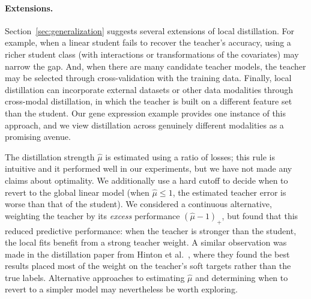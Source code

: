 \documentclass[12pt]{article}
\theoremstyle{definition}
\begin{document}
\paragraph{Extensions.} Section~\ref{sec:generalization} suggests several extensions of local distillation. For example, when a linear student fails to recover the teacher's accuracy, using a richer student class (with interactions or transformations of the covariates) may narrow the gap. And, when there are many candidate teacher models, the teacher may be selected through cross-validation with the training data. Finally, local distillation can incorporate external datasets or other data modalities through cross-modal distillation, in which the teacher is built on a different feature set than the student. Our gene expression example provides one instance of this approach, and we view distillation across genuinely different modalities as a promising avenue.

The distillation strength $\hat\mu$ is estimated using a ratio of losses; this rule is intuitive and it performed well in our experiments, but we have not made any claims about optimality. We additionally use a hard cutoff to decide when to revert to the global linear model (when $\hat \mu \leq 1$, the estimated teacher error is worse than that of the student).
We considered a continuous alternative, weighting the teacher by its \textit{excess} performance $(\hat\mu - 1)_+$, but found that this reduced predictive performance: when the teacher is stronger than the student, the local fits benefit from a strong teacher weight. 
A similar observation was made in the distillation paper from Hinton et al.~\cite{hinton2015distilling}, where they found the best results placed most of the weight on the teacher's soft targets rather than the true labels.
Alternative approaches to estimating $\hat\mu$ and determining when to revert to a simpler model may nevertheless be worth exploring.
\end{document}
